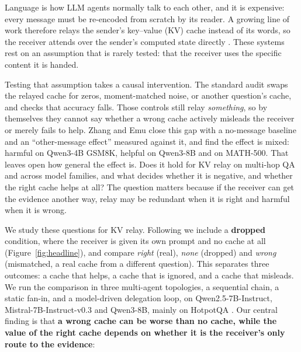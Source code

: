 \documentclass[11pt]{article}
\begin{document}
Language is how LLM agents normally talk to each other, and it is
expensive: every message must be re-encoded from scratch by its reader.
A growing line of work therefore relays the sender's key--value (KV)
cache instead of its words, so the receiver attends over the sender's
computed state directly \citep{kvcomm2025,latentmas2026}. These systems
rest on an assumption that is rarely tested: that the receiver uses the
specific content it is handed.

Testing that assumption takes a causal intervention. The standard audit
\citep{latentcommpay2026} swaps the relayed cache for zeros, moment-matched
noise, or another question's cache, and checks that accuracy falls. Those
controls still relay \emph{something}, so by themselves they cannot say
whether a wrong cache actively misleads the receiver or merely fails to
help. Zhang and Emu \citep{zhangemu2026} close this gap with a no-message
baseline and an ``other-message effect'' measured against it, and find
the effect is mixed: harmful on Qwen3-4B GSM8K, helpful on Qwen3-8B and
on MATH-500. That leaves open how general the effect is. Does it hold for
KV relay on multi-hop QA and across model families, and what decides
whether it is negative, and whether the right cache helps at all? The
question matters because if the receiver can get the evidence another way,
relay may be redundant when it is right and harmful when it is wrong.

We study these questions for KV relay. Following \citet{zhangemu2026} we
include a \textbf{dropped} condition, where the receiver is given its own
prompt and no cache at all (Figure~\ref{fig:headline}), and compare
\emph{right} (real), \emph{none} (dropped) and \emph{wrong} (mismatched, a
real cache from a different question). This separates three outcomes: a
cache that helps, a cache that is ignored, and a cache that misleads. We
run the comparison in three multi-agent topologies, a sequential chain, a
static fan-in, and a model-driven delegation loop, on Qwen2.5-7B-Instruct,
Mistral-7B-Instruct-v0.3 and Qwen3-8B, mainly on HotpotQA
\citep{hotpotqa2018}. Our central finding is that
\textbf{a wrong cache can be worse than no cache, while the value of the
right cache depends on whether it is the receiver's only route to the
evidence}:
\end{document}
